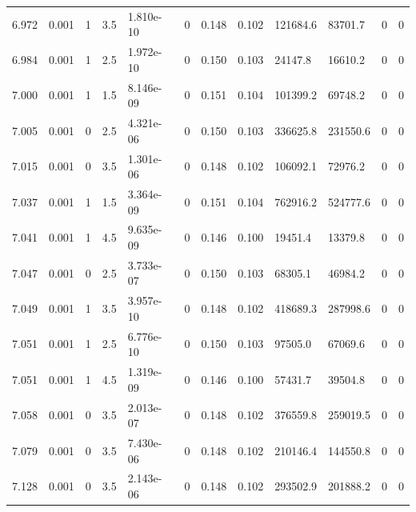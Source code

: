 \documentclass[preview]{standalone}
\begin{document}
{{{{{{{{{{{{{{{{\begin{tabular}{L{1.2cm}C{1.2cm} C{0.3cm}C{0.5cm} C{1.4cm}C{1.4cm} C{1.4cm}C{1.4cm} C{1.6cm}C{1.6cm} C{1.6cm}C{1.6cm}}
  6.972  &  0.001  & 1     & 3.5 &  1.810e-10  & 0  &  0.148&   0.102& 121684.6 & 83701.7   &  0 & 0  \\ 
  6.984  &  0.001  & 1     & 2.5 &  1.972e-10  & 0  &  0.150&   0.103& 24147.8 & 16610.2   &  0 & 0  \\ 
  7.000  &  0.001  & 1     & 1.5 &  8.146e-09  & 0  &  0.151&   0.104& 101399.2 & 69748.2   &  0 & 0  \\ 
  7.005  &  0.001  & 0     & 2.5 &  4.321e-06  & 0  &  0.150&   0.103& 336625.8 & 231550.6   &  0 & 0  \\ 
  7.015  &  0.001  & 0     & 3.5 &  1.301e-06  & 0  &  0.148&   0.102& 106092.1 & 72976.2   &  0 & 0  \\ 
  7.037  &  0.001  & 1     & 1.5 &  3.364e-09  & 0  &  0.151&   0.104& 762916.2 & 524777.6   &  0 & 0  \\ 
  7.041  &  0.001  & 1     & 4.5 &  9.635e-09  & 0  &  0.146&   0.100& 19451.4 & 13379.8   &  0 & 0  \\ 
  7.047  &  0.001  & 0     & 2.5 &  3.733e-07  & 0  &  0.150&   0.103& 68305.1 & 46984.2   &  0 & 0  \\ 
  7.049  &  0.001  & 1     & 3.5 &  3.957e-10  & 0  &  0.148&   0.102& 418689.3 & 287998.6   &  0 & 0  \\ 
  7.051  &  0.001  & 1     & 2.5 &  6.776e-10  & 0  &  0.150&   0.103& 97505.0 & 67069.6   &  0 & 0  \\ 
  7.051  &  0.001  & 1     & 4.5 &  1.319e-09  & 0  &  0.146&   0.100& 57431.7 & 39504.8   &  0 & 0  \\ 
  7.058  &  0.001  & 0     & 3.5 &  2.013e-07  & 0  &  0.148&   0.102& 376559.8 & 259019.5   &  0 & 0  \\ 
  7.079  &  0.001  & 0     & 3.5 &  7.430e-06  & 0  &  0.148&   0.102& 210146.4 & 144550.8   &  0 & 0  \\ 
  7.128  &  0.001  & 0     & 3.5 &  2.143e-06  & 0  &  0.148&   0.102& 293502.9 & 201888.2   &  0 & 0  \\ 
\hline 
\end{tabular} 

}}}}}}}}}}}}}}}}
\end{document}
